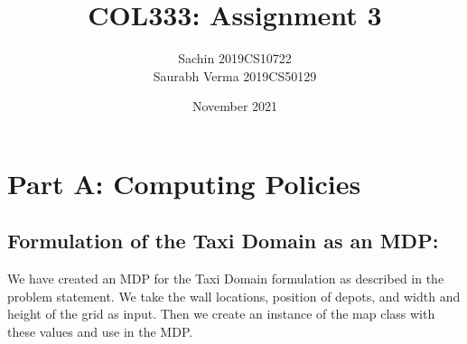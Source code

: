 \documentclass{article}
\title{COL333: Assignment 3}
\author{Sachin 2019CS10722\\ Saurabh Verma 2019CS50129 }
\date{November 2021}
\begin{document}
\maketitle

\section{Part A: Computing Policies}


\subsection{Formulation of the Taxi Domain as an MDP:}

We have created an MDP for the Taxi Domain formulation as described in the problem statement. We take the wall locations, position of depots, and width and height of the grid as input. Then we create an instance of the map class with these values and use in the MDP.
\end{document}
